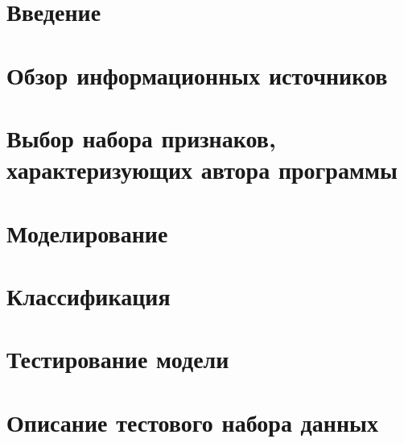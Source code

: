 
 

\newpage
%  
 
 \newpage
 
 
 
 
 \newpage
{}
 \tableofcontents

\newpage
\setcounter{section}{0}
\section*{Введение}


% 


\newpage 
\section{Обзор информационных источников }







\newpage 
\section{Выбор набора признаков, характеризующих автора программы}\label{features}
 
 
\newpage  
\section{Моделирование}\label{modeling}

 
 
\newpage  
\section{Классификация}\label{classifiers}


\newpage
\section{Тестирование модели}\label{crossval}


\newpage 
\section{Описание тестового набора данных}\label{test_data}

\clearpage
